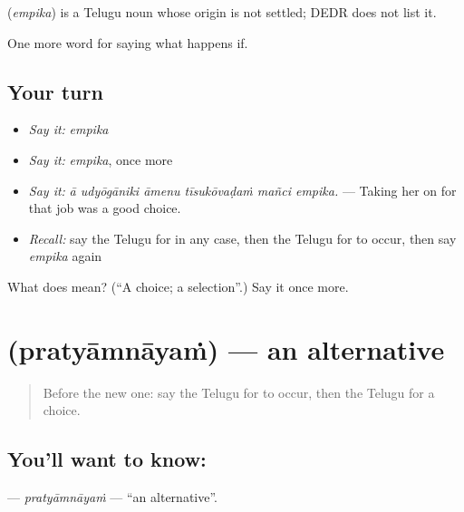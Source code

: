 \begin{cousinweb}
\textbf{} (\emph{empika}) is a Telugu noun whose origin is not settled; DEDR does not list it.
\end{cousinweb}

\begin{grammarlens}[title={What you've built}]
One more word for saying what happens if.
\end{grammarlens}

\subsection*{Your turn}
\begin{itemize}
\raggedright
  \item \emph{Say it:} \emph{empika}
  \item \emph{Say it:} \emph{empika}, once more
  \item \emph{Say it:} \emph{ā udyōgāniki āmenu tīsukōvaḍaṁ mañci empika.} — Taking her on for that job was a good choice.
  \item \emph{Recall:} say the Telugu for in any case, then the Telugu for to occur, then say \emph{empika} again
\end{itemize}

\begin{tcolorbox}[breakable,colback=teal!4,colframe=teal!35!black,title={Before you move on}]
What does  mean? (\textquotedblleft{}A choice; a selection\textquotedblright{}.) Say it once more.
\end{tcolorbox}
\section[\texorpdfstring{\te{ప్రత్యామ్నాయం} (pratyāmnāyaṁ)}{ప్రత్యామ్నాయం (pratyāmnāyaṁ)}]{ (pratyāmnāyaṁ) — an alternative}

\label{lesson:TE-C420-pratyamnayam}



\begin{quote}
Before the new one: say the Telugu for to occur, then the Telugu for a choice.
\end{quote}

\subsection*{You'll want to know: }
\textbf{} — \emph{pratyāmnāyaṁ} — \textquotedblleft{}an alternative\textquotedblright{}.

